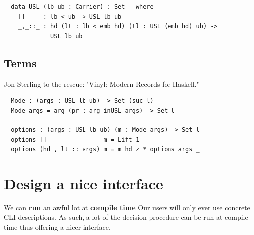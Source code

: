 \documentclass[dvipsnames]{beamer}
\begin{document}
\begin{frame}[fragile]
  \begin{verbatim}
  data USL (lb ub : Carrier) : Set _ where
    []     : lb < ub -> USL lb ub
    _,_::_ : hd (lt : lb < emb hd) (tl : USL (emb hd) ub) ->
             USL lb ub
  \end{verbatim}
\end{frame}

\begin{frame}
\end{frame}

\subsection{Terms}

\begin{frame}[fragile]
Jon Sterling to the rescue: "Vinyl: Modern Records for Haskell."

\begin{verbatim}
  Mode : (args : USL lb ub) -> Set (suc l)
  Mode args = arg (pr : arg inUSL args) -> Set l

  options : (args : USL lb ub) (m : Mode args) -> Set l
  options []                m = Lift 1
  options (hd , lt :: args) m = m hd z * options args _

\end{verbatim}

\end{frame}

\begin{frame}
\end{frame}

\section{Design a nice interface}
\begin{frame}[fragile]{We can \textbf{run} an awful lot at \textbf{compile time}}
Our users will only ever use concrete CLI descriptions. As such, a
lot of the decision procedure can be run at compile time thus offering
a nicer interface.

\end{frame}
\end{document}
